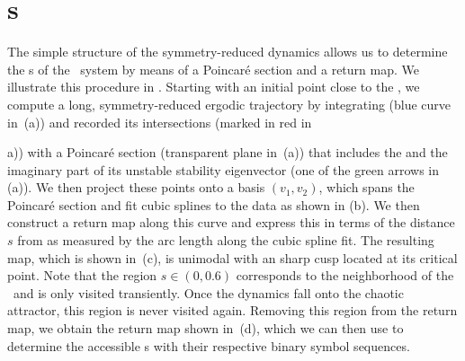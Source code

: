 \section{\Po s}
\label{s:numerics}

The simple structure of the symmetry-reduced dynamics allows us to
determine the \rpo s of the \twomode\ system by means of a Poincar\'e
section and a return map. We illustrate this procedure in
. Starting with an initial point close to the
\REQV{}{}, we compute a long, symmetry-reduced ergodic trajectory by integrating 
 (blue curve in
\,(a)) and recorded its intersections (marked
in red in \,{a)) with a Poincar\'e section
(transparent plane in \,(a)) that includes
the \REQV{}{} and the imaginary part of its unstable stability
eigenvector (one of the green arrows in (a)).
We then project these points onto a basis $(v_1, v_2)$, which
spans the Poincar\'e section and fit cubic splines to the data as shown in (b). 
We then construct a return map along this curve and express this in terms of the distance $s$ from \REQV{}{}
as measured by the arc length along the cubic spline fit. The resulting map, which is shown in
\,(c), is unimodal with an sharp cusp located at its critical point. 
Note that the region $s \in (0, 0.6)$ corresponds to
the neighborhood of the \reqv\  and is only visited transiently. Once the dynamics fall onto the chaotic
attractor, this region is never visited again. Removing this region from the return map, we
obtain the return map shown in \,(d), which we can then use to determine the 
accessible \rpo s  with their respective binary symbol sequences.

}
